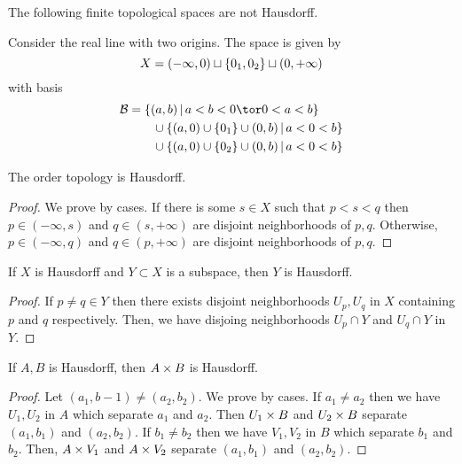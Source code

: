 \documentclass[12pt]{book} %
\newcommand{\B}{\mathcal B}
\begin{document}
\begin{example}
The following finite topological spaces are not Hausdorff.
\end{example}

\begin{example}
Consider the real line with two origins.
The space is given by
\[ X = (-\infty, 0) \sqcup \{0_1, 0_2\} \sqcup (0, +\infty) \]
with basis
\begin{align*}
\B &= \set{(a, b) \given a < b < 0 \tor 0 < a < b} \\
&\qquad \cup \set{(a, 0) \cup \set{0_1} \cup (0, b) \given a < 0 < b} \\
&\qquad \cup \set{(a, 0) \cup \set{0_2} \cup (0, b) \given a < 0 < b}
\end{align*}
\end{example}

\begin{theorem}
The order topology is Hausdorff.
\end{theorem}

\begin{proof}
We prove by cases.
If there is some \( s \in X \) such that \( p < s < q \) then \( p \in (-\infty, s) \) and \( q \in (s, +\infty) \) are disjoint neighborhoods of \( p, q \).
Otherwise, \( p \in (-\infty, q) \) and \( q \in (p, +\infty) \) are disjoint neighborhoods of \( p, q \).
\end{proof}

\begin{theorem}
If \( X \) is Hausdorff and \( Y \subset X \) is a subspace, then \( Y \) is Hausdorff.
\end{theorem}

\begin{proof}
If \( p \neq q \in Y \) then there exists disjoint neighborhoods \( U_p, U_q \) in \( X \) containing \( p \) and \( q \) respectively.
Then, we have disjoing neighborhoods \( U_p \cap Y \) and \( U_q \cap Y \) in \( Y \).
\end{proof}

\begin{theorem}
If \( A, B \) is Hausdorff, then \( A \times B \) is Hausdorff.
\end{theorem}

\begin{proof}
Let \( (a_1, b-1) \neq (a_2, b_2) \).
We prove by cases.
If \( a_1 \neq a_2 \) then we have \( U_1, U_2 \) in \( A \) which separate \( a_1 \) and \( a_2 \).
Then \( U_1 \times B \) and \( U_2 \times B \) separate \( (a_1, b_1) \) and \( (a_2, b_2) \).
If \( b_1 \neq b_2 \) then we have \( V_1, V_2 \) in \( B \) which separate \( b_1 \) and \( b_2 \).
Then, \( A \times V_1 \) and \( A \times V_2 \) separate \( (a_1, b_1) \) and \( (a_2, b_2) \).
\end{proof}
\end{document}
